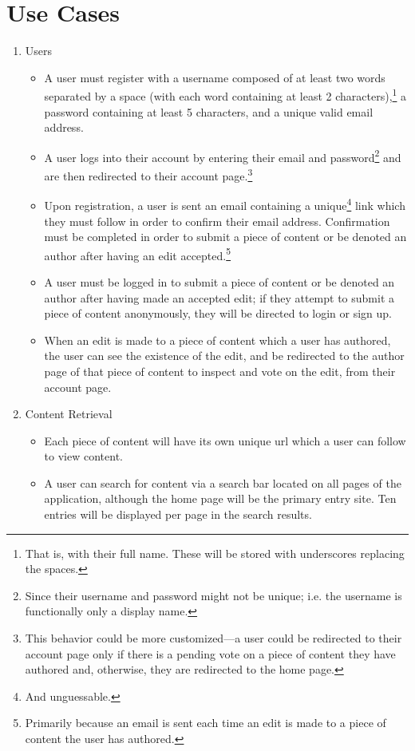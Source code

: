 \documentclass[12pt,letterpaper]{article}
\begin{document}
\section{Use Cases}

\begin{enumerate}
\item[] Users
\begin{itemize}
\item A user must register with a username composed of at least two words separated by a space (with each word containing at least 2 characters),\footnote{That is, with their full name. These will be stored with underscores replacing the spaces.} a password containing at least 5 characters, and a unique valid email address.  
\item A user logs into their account by entering their email and password\footnote{Since their username and password might not be unique; i.e. the username is functionally only a display name.} and are then redirected to their account page.\footnote{This behavior could be more customized---a user could be redirected to their account page only if there is a pending vote on a piece of content they have authored and, otherwise, they are redirected to the home page.}
\item Upon registration, a user is sent an email containing a unique\footnote{And unguessable.} link which they must follow in order to confirm their email address. Confirmation must be completed in order to submit a piece of content or be denoted an author after having an edit accepted.\footnote{Primarily because an email is sent each time an edit is made to a piece of content the user has authored.}
\item A user must be logged in to submit a piece of content or be denoted an author after having made an accepted edit; if they attempt to submit a piece of content anonymously, they will be directed to login or sign up. 
\item When an edit is made to a piece of content which a user has authored, the user can see the existence of the edit, and be redirected to the author page of that piece of content to inspect and vote on the edit, from their account page. 
\end{itemize}
\item[] Content Retrieval
\begin{itemize}
\item Each piece of content will have its own unique url which a user can follow to view content. 
\item A user can search for content via a search bar located on all pages of the application, although the home page will be the primary entry site. Ten entries will be displayed per page in the search results. 

\end{itemize}
\end{enumerate}
\end{document}
